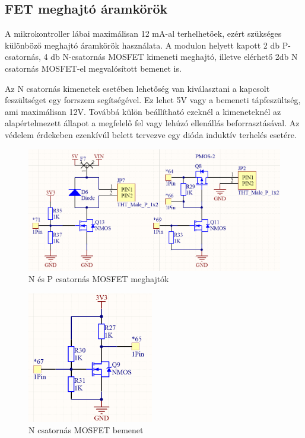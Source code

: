 \subsection{FET meghajtó áramkörök}
A mikrokontroller lábai maximálisan 12 mA-al terhelhetőek, ezért szükséges különböző meghajtó áramkörök használata. A modulon helyett kapott 2 db P-csatornás, 4 db N-csatornás MOSFET kimeneti meghajtó, illetve elérhető 2db N csatornás MOSFET-el megvalósított bemenet is.

Az N csatornás kimenetek esetében lehetőség van kiválasztani a kapcsolt feszültséget egy forrszem segítségével. Ez lehet 5V vagy a bemeneti tápfeszültség, ami maximálisan 12V. Továbbá külön beállítható ezeknél a kimeneteknél az alapértelmezett állapot a megfelelő fel vagy lehúzó ellenállás beforrasztásával. Az védelem érdekeben ezenkívúl belett tervezve egy dióda induktív terhelés esetére.

\begin{figure}[!ht]
    \centering
    \includegraphics[width=140mm, keepaspectratio]{figures/n_p_driver.png}
    \caption{N és P csatornás MOSFET meghajtók}
    \label{fig:TeXstudio}
\end{figure}

\begin{figure}[!ht]
    \centering
    \includegraphics[width=55mm, keepaspectratio]{figures/n_input.png}
    \caption{N csatornás MOSFET bemenet}
    \label{fig:TeXstudio}
\end{figure}

